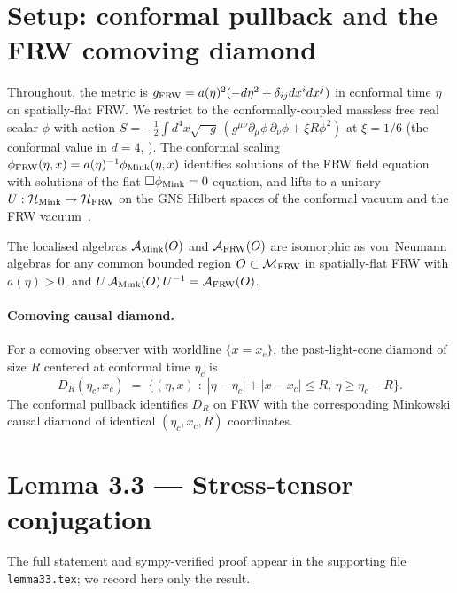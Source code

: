 \documentclass[11pt,a4paper]{article}
\theoremstyle{remark}
\newcommand{\FRW}{{\rm FRW}}
\newcommand{\Mink}{{\rm Mink}}
\begin{document}
\section{Setup: conformal pullback and the FRW comoving diamond}
\label{sec:setup}

Throughout, the metric is
$g_{\FRW}=a(\eta)^{2}(-d\eta^{2}+\delta_{ij}dx^{i}dx^{j})$ in conformal
time $\eta$ on spatially-flat FRW.  We restrict to the
conformally-coupled massless free real scalar $\phi$ with action
$S=-\tfrac12\int d^4x\sqrt{-g}\,(g^{\mu\nu}\partial_\mu\phi\,\partial_\nu\phi
+\xi R\phi^2)$ at $\xi=1/6$ (the conformal value in $d=4$,
\cite{BirrellDavies1982,Wald1994}). The conformal scaling
$\phi_{\FRW}(\eta,x) = a(\eta)^{-1}\phi_{\Mink}(\eta,x)$ identifies
solutions of the FRW field equation with solutions of the flat
$\Box \phi_{\Mink}=0$ equation, and lifts to a unitary
$U:\mathcal H_{\Mink}\to\mathcal H_{\FRW}$ on the GNS Hilbert spaces of
the conformal vacuum and the FRW vacuum~\cite{Frob2023}.

The localised algebras $\mathcal A_{\Mink}(O)$ and
$\mathcal A_{\FRW}(O)$ are isomorphic as von~Neumann algebras for any
common bounded region $O\subset\mathcal M_{\FRW}$ in spatially-flat FRW
with $a(\eta)>0$, and $U\,\mathcal A_{\Mink}(O)\,U^{-1}=\mathcal A_{\FRW}(O)$.

\paragraph{Comoving causal diamond.}
For a comoving observer with worldline $\{x=x_c\}$, the past-light-cone
diamond of size $R$ centered at conformal time $\eta_c$ is
\[
   D_R(\eta_c,x_c)\;=\;
   \{(\eta,x)\;:\;|\eta-\eta_c|+|x-x_c|\le R,\,\eta\ge\eta_c-R\}.
\]
The conformal pullback identifies $D_R$ on FRW with the corresponding
Minkowski causal diamond of identical $(\eta_c,x_c,R)$ coordinates.

\section{Lemma 3.3 — Stress-tensor conjugation}
\label{sec:lemma33}

The full statement and sympy-verified proof appear in the supporting
file \texttt{lemma33.tex}; we record here only the result.
\end{document}
